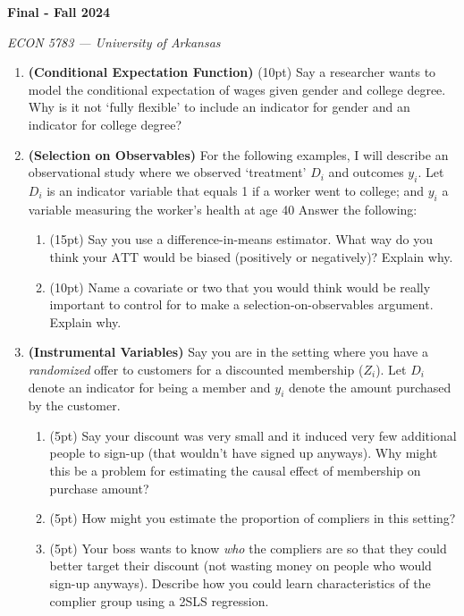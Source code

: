 \documentclass[12pt]{article}
\newcommand{\pts}[1]{{\color{zinc500}#1}}
\begin{document}
\begin{center}
  {\Huge\bf Final - Fall 2024}
  
  \smallskip
  {\large\it ECON 5783 — University of Arkansas}
\end{center}

\medskip
\begin{enumerate}
  \item \textbf{(Conditional Expectation Function)} \pts{(10pt)} Say a researcher wants to model the conditional expectation of wages given gender and college degree. Why is it not `fully flexible' to include an indicator for gender and an indicator for college degree?


  \item \textbf{(Selection on Observables)}  For the following examples, I will describe an observational study where we observed `treatment' $D_i$ and outcomes $y_i$. Let $D_i$ is an indicator variable that equals 1 if a worker went to college; and $y_i$ a variable measuring the worker's health at age 40 Answer the following: 
  \begin{enumerate}[leftmargin = 2em]
    \item \pts{(15pt)} Say you use a difference-in-means estimator. What way do you think your $\text{ATT}$ would be biased (positively or negatively)? Explain why. 
    
    \item \pts{(10pt)} Name a covariate or two that you would think would be really important to control for to make a selection-on-observables argument. Explain why.
  \end{enumerate}

  \item \textbf{(Instrumental Variables)} Say you are in the setting where you have a \emph{randomized} offer to customers for a discounted membership ($Z_i$). Let $D_i$ denote an indicator for being a member and $y_i$ denote the amount purchased by the customer.
  \begin{enumerate}[leftmargin = 2em]
    \item \pts{(5pt)} Say your discount was very small and it induced very few additional  people to sign-up (that wouldn't have signed up anyways). Why might this be a problem for estimating the causal effect of membership on purchase amount?

    \item \pts{(5pt)} How might you estimate the proportion of compliers in this setting?
    
    \item \pts{(5pt)} Your boss wants to know \emph{who} the compliers are so that they could better target their discount (not wasting money on people who would sign-up anyways). Describe how you could learn characteristics of the complier group using a 2SLS regression.
  \end{enumerate}
  


\end{enumerate}
\end{document}
